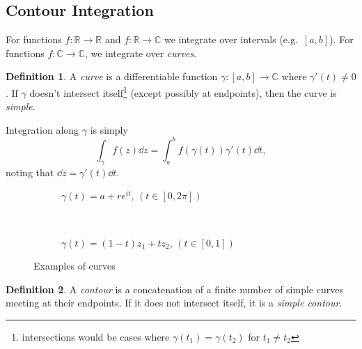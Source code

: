 \documentclass[10pt]{scrartcl}
\numberwithin{equation}{subsection}
\theoremstyle{definition}
\newtheorem{definition}{Definition}[section]
\theoremstyle{remark}
\newenvironment{definitionSR}
	{
		\begin{siderules}
			\begin{definition}
			}
			{
			\end{definition}
		\end{siderules}
	}
\newcommand{\Reals}{\mathbb{R}}
\newcommand{\Complex}{\mathbb{C}}
\begin{document}
\subsection{Contour Integration}
For functions $f:\Reals \to \Reals$ and $f:\Reals \to \Complex$ we integrate
over intervals (e.g.\ $[a,b]$). For functions $f:\Complex \to \Complex$, we
integrate over \textit{curves}.
\begin{definitionSR}
A \textit{curve} is a differentiable function $\gamma : [a,b] \to \Complex$
where $\gamma'(t) \neq 0$. If $\gamma$ doesn't intersect
itself\footnote{intersections would be cases where $\gamma(t_1) = \gamma(t_2)$
for $t_1\neq t_2$} (except possibly at endpoints), then the curve is \textit{simple}.

Integration along $\gamma$ is simply
\[
\int_\gamma f(z)\dd{z} = \int_a^b f(\gamma(t))\gamma'(t)\dd{t},
\]
noting that $\dd{z} = \gamma'(t)\dd{t}$.
\end{definitionSR}
\begin{figure}[h]
\centering
\begin{subfigure}[b]{.4\textwidth}
\caption{$\gamma(t) = a + re^{it}$, $(t \in [0,2\pi])$}
\end{subfigure}
~~
\begin{subfigure}[b]{.4\textwidth}
\caption{$\gamma(t) = (1-t)z_1 + tz_2$, $(t \in [0,1])$}
\end{subfigure}
\caption{Examples of curves}
\end{figure}
\begin{definitionSR}
A \textit{contour} is a concatenation of a finite number 
of simple curves meeting at their endpoints. If it does not intersect 
itself, it is a \textit{simple contour}.
\end{definitionSR}
\end{document}
